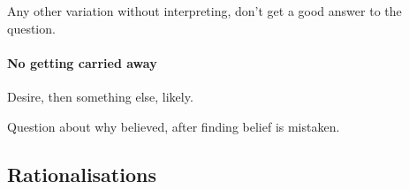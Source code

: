 \begin{note}
  Any other variation without interpreting, don't get a good answer to the question.
\end{note}

\paragraph{No getting carried away}

\begin{note}
  Desire, then something else, likely.
\end{note}

\begin{note}
  Question about why believed, after finding belief is mistaken.
\end{note}

\subsection{Rationalisations}
\label{sec:rationalisations}

